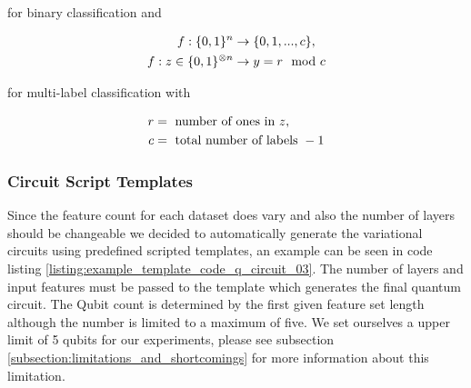 for binary classification and 

\begin{equation}
    \centering
    \begin{split}
        f: \{0,1\}^n & \rightarrow  \{0,1,...,c\}, \\
        f: z \in \{0,1\}^{\otimes n} & \rightarrow y = r \mod c
    \end{split}
    \label{equation:parity_function_multi-class_classifier_definition}
\end{equation}

for multi-label classification with 

\begin{equation}
    \centering
    \begin{split}
        r & = \text{ number of ones in } z,\\
        c & = \text{ total number of labels } -1
    \end{split}
    \label{equation:parity_function_multi-class_classifier_definition_preliminary}
\end{equation}



\subsubsection{Circuit Script Templates}
Since the feature count for each dataset does vary and also the number of layers should be changeable we decided to automatically generate the variational circuits using predefined scripted templates, an example can be seen in code listing \ref{listing:example_template_code_q_circuit_03}. The number of layers and input features must be passed to the template which generates the final quantum circuit. The Qubit count is determined by the first given feature set length although the number is limited to a maximum of five. We set ourselves a upper limit of 5 qubits for our experiments, please see subsection \ref{subsection:limitations_and_shortcomings} for more information about this limitation.

